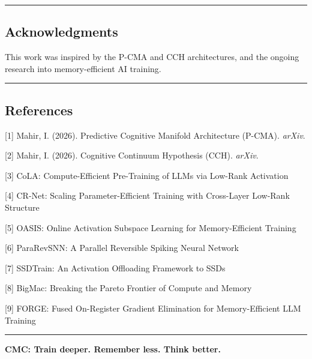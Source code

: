 \documentclass[
  11pt,
  a4paper,
]{article}
\begin{document}
\begin{center}\rule{0.5\linewidth}{0.5pt}\end{center}

\subsection{Acknowledgments}\label{acknowledgments}

This work was inspired by the P-CMA and CCH architectures, and the
ongoing research into memory-efficient AI training.

\begin{center}\rule{0.5\linewidth}{0.5pt}\end{center}

\subsection{References}\label{references}

{[}1{]} Mahir, I. (2026). Predictive Cognitive Manifold Architecture
(P-CMA). \emph{arXiv}.

{[}2{]} Mahir, I. (2026). Cognitive Continuum Hypothesis (CCH).
\emph{arXiv}.

{[}3{]} CoLA: Compute-Efficient Pre-Training of LLMs via Low-Rank
Activation

{[}4{]} CR-Net: Scaling Parameter-Efficient Training with Cross-Layer
Low-Rank Structure

{[}5{]} OASIS: Online Activation Subspace Learning for Memory-Efficient
Training

{[}6{]} ParaRevSNN: A Parallel Reversible Spiking Neural Network

{[}7{]} SSDTrain: An Activation Offloading Framework to SSDs

{[}8{]} BigMac: Breaking the Pareto Frontier of Compute and Memory

{[}9{]} FORGE: Fused On-Register Gradient Elimination for
Memory-Efficient LLM Training

\begin{center}\rule{0.5\linewidth}{0.5pt}\end{center}

\textbf{CMC: Train deeper. Remember less. Think better.}
\end{document}
